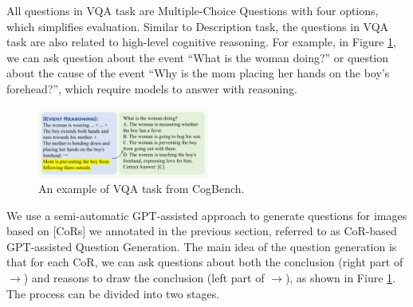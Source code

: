 All questions in VQA task are Multiple-Choice Questions with four options, which simplifies evaluation.
Similar to Description task, the questions in VQA task are also related to high-level cognitive reasoning. 
For example, in Figure \ref{fig:qa_example}, we can ask question about the event ``What is the woman doing?'' or question about the cause of the event ``Why is the mom placing her hands on the boy's forehead?'', which require models to answer with reasoning.

\begin{figure}
  \centering
  \includegraphics[width=0.5\textwidth]{figs/vqa_task_3.pdf}
  \caption{An example of VQA task from CogBench. 
}
  \label{fig:qa_example}
\end{figure}


We use a semi-automatic GPT-assisted approach to generate questions for images based on [CoRs] we annotated in the previous section, referred to as CoR-based GPT-assisted Question Generation. 
The main idea of the question generation is that for each CoR, we can ask questions about both the conclusion (right part of $\rightarrow$) and reasons to draw the conclusion (left part of $\rightarrow$), as shown in Fiure \ref{fig:qa_example}. 
The process can be divided into two stages.

